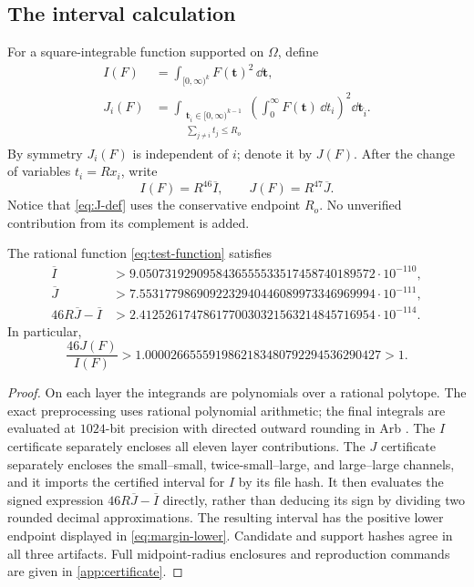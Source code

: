 \subsection{The interval calculation}

For a square-integrable function supported on $\Omega$, define
\begin{align}
 I(F)&=\int_{[0,\infty)^k}F(\mathbf t)^2\,\dd\mathbf t,
\label{eq:I-def}\\
 J_i(F)&=
 \int_{\substack{\mathbf t_{\widehat i}\in[0,\infty)^{k-1}\\
                  \sum_{j\ne i}t_j\le R_o}}
 \left(\int_0^\infty F(\mathbf t)\,\dd t_i\right)^2
 \dd\mathbf t_{\widehat i}.
\label{eq:J-def}
\end{align}
By symmetry $J_i(F)$ is independent of $i$; denote it by $J(F)$.
After the change of variables $t_i=Rx_i$, write
\[
 I(F)=R^{46}\overline I,\qquad
 J(F)=R^{47}\overline J.
\]
Notice that \cref{eq:J-def} uses the conservative endpoint $R_o$.
No unverified contribution from its complement is added.

\begin{theorem}
\label{thm:finite-certificate}
The rational function \cref{eq:test-function} satisfies
\begin{align}
 \overline I&>
 9.0507319290958436555533517458740189572\cdot10^{-110},
\label{eq:I-lower}\\
 \overline J&>
 7.5531779869092232940446089973346969994\cdot10^{-111},
\label{eq:J-lower}\\
 46R\overline J-\overline I&>
 2.4125261747861770030321563214845716954\cdot10^{-114}.
\label{eq:margin-lower}
\end{align}
In particular,
\begin{equation}\label{eq:score-lower}
 \frac{46J(F)}{I(F)}>
 1.0000266555919862183480792294536290427>1.
\end{equation}
\end{theorem}

\begin{proof}
On each layer the integrands are polynomials over a rational polytope.
The exact preprocessing uses rational polynomial arithmetic; the final
integrals are evaluated at $1024$-bit precision with directed outward
rounding in Arb \cite{Arb}.  The $I$ certificate separately encloses all
eleven layer contributions.  The $J$ certificate separately encloses the
small--small, twice-small--large, and large--large channels, and it imports
the certified interval for $I$ by its file hash.  It then evaluates the
signed expression $46R\overline J-\overline I$ directly, rather than
deducing its sign by dividing two rounded decimal approximations.
The resulting interval has the positive lower endpoint displayed in
\cref{eq:margin-lower}.  Candidate and support hashes agree in all three
artifacts.  Full midpoint-radius enclosures and reproduction commands are
given in \cref{app:certificate}.
\end{proof}

